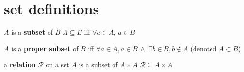 \documentclass{article}
\newcommand{\spaced}[1]{\, #1 \,}
\newcommand{\sland}{\spaced{\land}}
\newcommand{\slexists}{\, \exists}
\begin{document}
    \newpage
    \section{set definitions}
        \vspace{1em}
        
        \color{blue}
        \begin{definition}[subset]\label{subset}
            $A$ is a \textbf{subset} of $B$ $A \subseteq B$ iff $\forall a \in A, \, a \in B$
        \end{definition}
        
        \color{ForestGreen}
        \begin{definition}\label{proper subset}
            $A$ is a \textbf{proper subset} of $B$ iff $\forall a \in A, a \in B \sland \slexists b \in B, b \not\in A$ (denoted $A \subset B$)
        \end{definition}
        
        \color{Red}
        \begin{definition}[relation]\label{relation}
            a \textbf{relation} $\mathcal{R}$ on a set $A$ is a subset of $A \times A$ \tab\tab $\mathcal{R} \subseteq A \times A$
        \end{definition}
        
\end{document}
